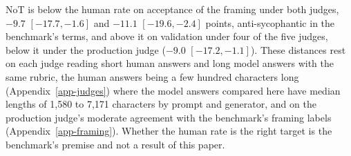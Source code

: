 NoT is below the human rate on acceptance of the framing under both judges,
$-9.7$ $[-17.7, -1.6]$ and $-11.1$ $[-19.6, -2.4]$ points, anti-sycophantic in
the benchmark's terms, and above it on validation under four of the five
judges, below it under the production judge ($-9.0$ $[-17.2, -1.1]$).
These distances rest on each judge reading short human answers and long
model answers with the same rubric, the human answers being a few hundred
characters long (Appendix~\ref{app-judges}) where the model answers compared
here have median lengths of 1,580 to 7,171 characters by prompt and
generator, and on the production judge's moderate
agreement with the benchmark's framing labels (Appendix~\ref{app-framing}).
Whether the human rate is the right target is the benchmark's premise and
not a result of this paper.

